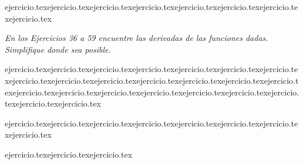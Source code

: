 \begin{enumerate}
    \setcounter{enumi}{27}
    {ejercicio.tex}{ejercicio.tex}{ejercicio.tex}{ejercicio.tex}{ejercicio.tex}{ejercicio.tex}{ejercicio.tex}{ejercicio.tex}\end{enumerate}

\vspace{1em}
\noindent \textit{En los Ejercicios 36 a 59 encuentre las derivadas de las funciones dadas. Simplifique donde sea posible.}

\begin{enumerate}
    \setcounter{enumi}{35}
    \begin{minipage}{0.45\textwidth}
    {ejercicio.tex}{ejercicio.tex}{ejercicio.tex}{ejercicio.tex}{ejercicio.tex}{ejercicio.tex}{ejercicio.tex}{ejercicio.tex}{ejercicio.tex}{ejercicio.tex}{ejercicio.tex}{ejercicio.tex}{ejercicio.tex}{ejercicio.tex}{ejercicio.tex}{ejercicio.tex}{ejercicio.tex}{ejercicio.tex}{ejercicio.tex}{ejercicio.tex}{ejercicio.tex}{ejercicio.tex}{ejercicio.tex}\end{minipage}%
    \begin{minipage}{0.45\textwidth}
    \setcounter{enumi}{60}
    {ejercicio.tex}{ejercicio.tex}{ejercicio.tex}{ejercicio.tex}{ejercicio.tex}{ejercicio.tex}{ejercicio.tex}{ejercicio.tex}\end{minipage}
\end{enumerate}

\begin{enumerate}
    \setcounter{enumi}{67}
    {ejercicio.tex}{ejercicio.tex}{ejercicio.tex}\end{enumerate}

